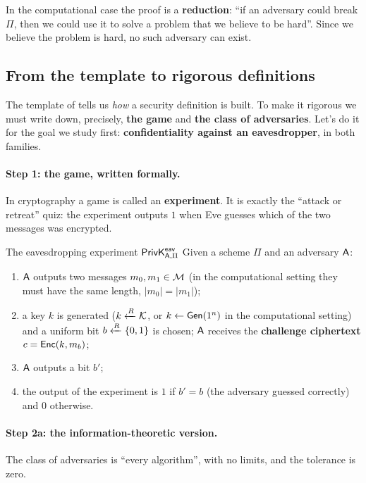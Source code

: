 In the computational case the proof is a \textbf{reduction}: ``if an adversary could break $\Pi$, then we could use it to solve a problem that we believe to be hard''. Since we believe the problem is hard, no such adversary can exist.

\subsection{From the template to rigorous definitions}\label{sec:rigorous}

The template of  tells us \textit{how} a security definition is built. To make it rigorous we must write down, precisely, \textbf{the game} and \textbf{the class of adversaries}. Let's do it for the goal we study first: \textbf{confidentiality against an eavesdropper}, in both families.

\paragraph{Step 1: the game, written formally.} In cryptography a game is called an \textbf{experiment}. It is exactly the ``attack or retreat'' quiz: the experiment outputs $1$ when Eve guesses which of the two messages was encrypted.

\begin{frameddefn}[label={def:privk}]{The eavesdropping experiment $\mathsf{PrivK}^{\mathsf{eav}}_{\mathsf{A},\Pi}$}
  Given a scheme $\Pi$ and an adversary $\mathsf{A}$:
  \begin{enumerate}
    \item $\mathsf{A}$ outputs two messages $m_0, m_1 \in \mathcal{M}$ (in the computational setting they must have the same length, $|m_0| = |m_1|$);
    \item a key $k$ is generated ($k \xleftarrow{R} \mathcal{K}$, or $k \leftarrow \mathsf{Gen}(1^n)$ in the computational setting) and a uniform bit $b \xleftarrow{R} \{0,1\}$ is chosen; $\mathsf{A}$ receives the \textbf{challenge ciphertext} $c = \mathsf{Enc}(k, m_b)$;
    \item $\mathsf{A}$ outputs a bit $b'$;
    \item the output of the experiment is $1$ if $b' = b$ (the adversary guessed correctly) and $0$ otherwise.
  \end{enumerate}
\end{frameddefn}

\paragraph{Step 2a: the information-theoretic version.} The class of adversaries is ``every algorithm'', with no limits, and the tolerance is zero.

